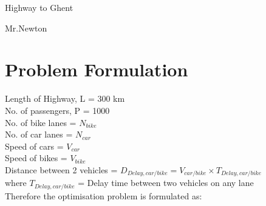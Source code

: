 \documentclass{article}
\begin{document}
\centerline{\sc \large Highway to Ghent}
\centerline{Mr.Newton}

\section{Problem Formulation}

Length of Highway, L = 300 km\\
No. of passengers, P = 1000\\
No. of bike lanes = $N_{bike}$\\
No. of car lanes = $N_{car}$\\
Speed of cars = $V_{car}$\\
Speed of bikes = $V_{bike}$\\
Distance between 2 vehicles = $D_{Delay, car/bike} = V_{car/bike} \times T_{Delay, car/bike}$\\
where $T_{Delay, car/bike}$ = Delay time between two vehicles on any lane\\

Therefore the optimisation problem is formulated as:\\
\end{document}
